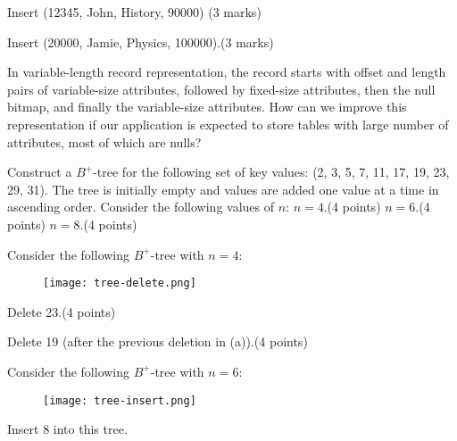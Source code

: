 \documentclass[a4 paper]{article}
\begin{document}
 Insert (12345, John, History, 90000) (3 marks)


 Insert (20000, Jamie, Physics, 100000).\indent (3 marks)




In variable-length record representation, the record starts with offset and length pairs of variable-size attributes, followed by fixed-size attributes, then the null bitmap, and finally the variable-size attributes. How can we improve this representation if our application is expected to store tables with large number of attributes, most of which are nulls?



Construct a $B^{+}$-tree for the following set of key values: (2, 3, 5, 7, 11, 17, 19, 23, 29, 31). The tree is initially empty and values are added one value at a time in ascending order. Consider the following values of $n$:
 $n = 4$.\indent \indent (4 points)
 $n = 6$.\indent \indent (4 points)
 $n = 8$.\indent \indent (4 points)



Consider the following $B^{+}$-tree with $n = 4$:
\begin{figure}[h]
\texttt{[image: tree-delete.png]}
\end{figure}

 Delete 23.\indent \indent (4 points)

 Delete 19 (after the previous deletion in (a)).\indent \indent (4 points)

Consider the following $B^{+}$-tree with $n = 6$:
\begin{figure}[h]
\texttt{[image: tree-insert.png]}
\end{figure}
Insert 8 into this tree.
\end{document}
